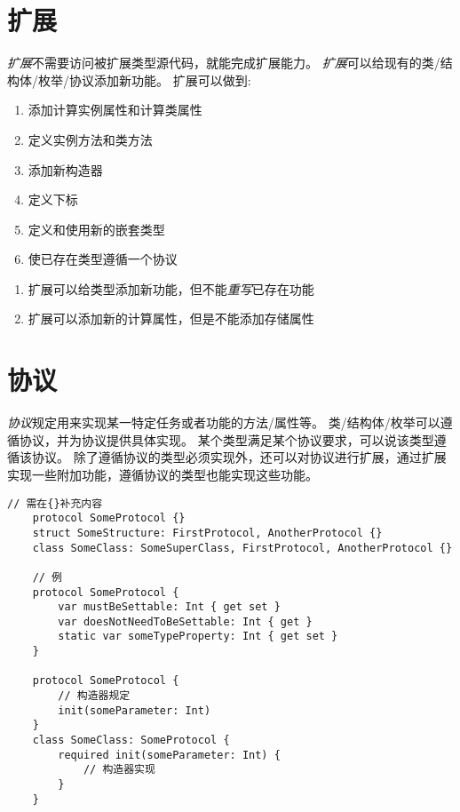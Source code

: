 \documentclass{../main.tex}{subfiles}
\begin{document}
\section{扩展}
\emph{扩展}不需要访问被扩展类型源代码，就能完成扩展能力。
\emph{扩展}可以给现有的类/结构体/枚举/协议添加新功能。
扩展可以做到:
\begin{enumerate}[itemsep=0pt, parsep=0pt, topsep=0pt, partopsep=0pt]
    \item 添加计算实例属性和计算类属性
    \item 定义实例方法和类方法
    \item 添加新构造器
    \item 定义下标
    \item 定义和使用新的嵌套类型
    \item 使已存在类型遵循一个协议
\end{enumerate}
\begin{ArtCaution}
    \begin{enumerate}[itemsep=0pt, parsep=0pt, topsep=0pt, partopsep=0pt]
        \item 扩展可以给类型添加新功能，但不能\emph{重写}已存在功能
        \item 扩展可以添加新的计算属性，但是不能添加存储属性
    \end{enumerate}
\end{ArtCaution}





\section{协议}
\emph{协议}规定用来实现某一特定任务或者功能的方法/属性等。
类/结构体/枚举可以遵循协议，并为协议提供具体实现。
某个类型满足某个协议要求，可以说该类型遵循该协议。
除了遵循协议的类型必须实现外，还可以对协议进行扩展，通过扩展实现一些附加功能，遵循协议的类型也能实现这些功能。
\begin{lstlisting}[style = CodeLstStyleSwift, title = {协议基本框架与示例}]
    // 需在{}补充内容
    protocol SomeProtocol {}
    struct SomeStructure: FirstProtocol, AnotherProtocol {}
    class SomeClass: SomeSuperClass, FirstProtocol, AnotherProtocol {}

    // 例
    protocol SomeProtocol {
        var mustBeSettable: Int { get set }
        var doesNotNeedToBeSettable: Int { get }
        static var someTypeProperty: Int { get set }
    }

    protocol SomeProtocol {
        // 构造器规定
        init(someParameter: Int)
    }
    class SomeClass: SomeProtocol {
        required init(someParameter: Int) {
            // 构造器实现
        }
    }
\end{lstlisting}
\end{document}
